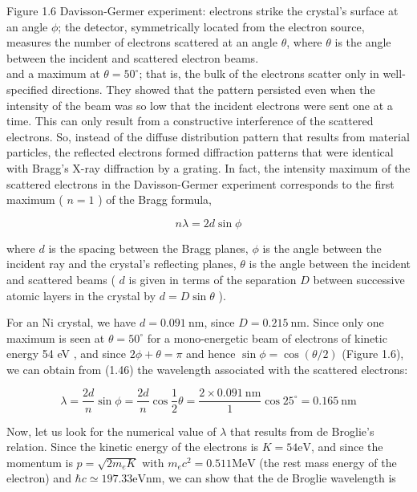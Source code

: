 \documentclass[10pt]{article}
\begin{document}
Figure 1.6 Davisson-Germer experiment: electrons strike the crystal's surface at an angle $\phi$; the detector, symmetrically located from the electron source, measures the number of electrons scattered at an angle $\theta$, where $\theta$ is the angle between the incident and scattered electron beams.\\
and a maximum at $\theta=50^{\circ}$; that is, the bulk of the electrons scatter only in well-specified directions. They showed that the pattern persisted even when the intensity of the beam was so low that the incident electrons were sent one at a time. This can only result from a constructive interference of the scattered electrons. So, instead of the diffuse distribution pattern that results from material particles, the reflected electrons formed diffraction patterns that were identical with Bragg's X-ray diffraction by a grating. In fact, the intensity maximum of the scattered electrons in the Davisson-Germer experiment corresponds to the first maximum ( $n=1$ ) of the Bragg formula,


\begin{equation*}
n \lambda=2 d \sin \phi \tag{1.46}
\end{equation*}


where $d$ is the spacing between the Bragg planes, $\phi$ is the angle between the incident ray and the crystal's reflecting planes, $\theta$ is the angle between the incident and scattered beams ( $d$ is given in terms of the separation $D$ between successive atomic layers in the crystal by $d=D \sin \theta$ ).

For an Ni crystal, we have $d=0.091 \mathrm{~nm}$, since $D=0.215 \mathrm{~nm}$. Since only one maximum is seen at $\theta=50^{\circ}$ for a mono-energetic beam of electrons of kinetic energy 54 eV , and since $2 \phi+\theta=\pi$ and hence $\sin \phi=\cos (\theta / 2)$ (Figure 1.6), we can obtain from (1.46) the wavelength associated with the scattered electrons:


\begin{equation*}
\lambda=\frac{2 d}{n} \sin \phi=\frac{2 d}{n} \cos \frac{1}{2} \theta=\frac{2 \times 0.091 \mathrm{~nm}}{1} \cos 25^{\circ}=0.165 \mathrm{~nm} \tag{1.47}
\end{equation*}


Now, let us look for the numerical value of $\lambda$ that results from de Broglie's relation. Since the kinetic energy of the electrons is $K=54 \mathrm{eV}$, and since the momentum is $p=\sqrt{2 m_{e} K}$ with $m_{e} c^{2}=0.511 \mathrm{MeV}$ (the rest mass energy of the electron) and $\hbar c \simeq 197.33 \mathrm{eV} \mathrm{nm}$, we can show that the de Broglie wavelength is
\end{document}
